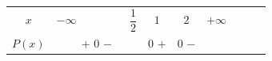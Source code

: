 \begin{alist}
\begin{center}
\begin{tabular}{|c|c|c|c|c|c|c|c|}
$x$ & $-\infty \hspace{2cm} \dfrac{1}{2}$ & $1$ & $2$ & $+\infty$ \\ 
$P(x)$ & $+$ \hspace{0.5cm} $0$ \hspace{0.5cm} $-$ & $0$ \hspace{0.5cm} $+$ & $0$ \hspace{0.5cm} $-$ \\ 
\end{tabular}
\end{center}
\end{alist}

